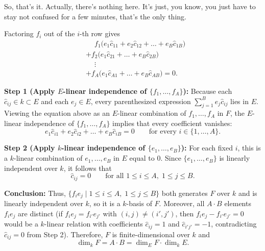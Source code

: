 \begin{proofWrapper}
\begin{speech}[00:36:46 - 00:37:58]
So, that's it. Actually, there's nothing here. It's just, you know, you just have to stay not confused for a few minutes, that's the only thing.
\end{speech}

\begin{content}
Factoring $f_i$ out of the $i$-th row gives
\begin{align*}
  &\phantom{+} f_1 \bigl( e_1 \hat{c}_{11} + e_2 \hat{c}_{12} + \dots + e_B \hat{c}_{1B} \bigr) \\
  &+ f_2 \bigl( e_1 \hat{c}_{21} + \dots + e_B \hat{c}_{2B} \bigr) \\
  &\phantom{+} \vdots \\
  &+ f_A \bigl( e_1 \hat{c}_{A1} + \dots + e_B \hat{c}_{AB} \bigr) = 0.
\end{align*}

\textbf{Step 1 (Apply $E$-linear independence of $\{f_1, \dots, f_A\}$):} Because each $\hat{c}_{ij} \in k \subset E$ and each $e_j \in E$, every parenthesized expression $\sum_{j=1}^B e_j \hat{c}_{ij}$ lies in $E$. Viewing the equation above as an $E$-linear combination of $f_1, \dots, f_A$ in $F$, the $E$-linear independence of $\{f_1, \dots, f_A\}$ implies that every coefficient vanishes:
\[
e_1 \hat{c}_{i1} + e_2 \hat{c}_{i2} + \dots + e_B \hat{c}_{iB} = 0 \qquad \text{for every } i \in \{1, \dots, A\}.
\]

\textbf{Step 2 (Apply $k$-linear independence of $\{e_1, \dots, e_B\}$):} For each fixed $i$, this is a $k$-linear combination of $e_1, \dots, e_B$ in $E$ equal to $0$. Since $\{e_1, \dots, e_B\}$ is linearly independent over $k$, it follows that
\[
\hat{c}_{ij} = 0 \qquad \text{for all } 1 \le i \le A,\; 1 \le j \le B.
\]

\textbf{Conclusion:} Thus, $\{f_i e_j \mid 1 \le i \le A,\; 1 \le j \le B\}$ both generates $F$ over $k$ and is linearly independent over $k$, so it is a $k$-basis of $F$. Moreover, all $A \cdot B$ elements $f_i e_j$ are distinct (if $f_i e_j = f_{i'} e_{j'}$ with $(i, j) \neq (i', j')$, then $f_i e_j - f_{i'} e_{j'} = 0$ would be a $k$-linear relation with coefficients $\hat{c}_{ij} = 1$ and $\hat{c}_{i'j'} = -1$, contradicting $\hat{c}_{ij} = 0$ from Step 2). Therefore, $F$ is finite-dimensional over $k$ and
\[
\dim_k F = A \cdot B = \dim_E F \cdot \dim_k E.
\]
\end{content}

\end{proofWrapper}

